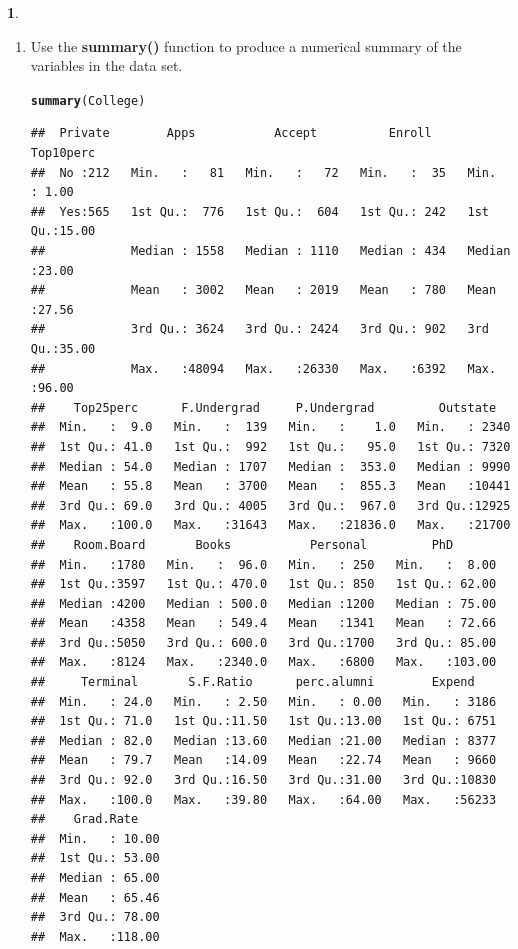 \documentclass[12pt,fleqn]{article}\usepackage[]{graphicx}\usepackage[]{color}
\makeatletter
\newcommand{\hlstd}[1]{\textcolor[rgb]{0.345,0.345,0.345}{#1}}%
\newcommand{\hlkwd}[1]{\textcolor[rgb]{0.737,0.353,0.396}{\textbf{#1}}}%
\newenvironment{kframe}{%
 \def\at@end@of@kframe{}%
 \ifinner\ifhmode%
  \def\at@end@of@kframe{\end{minipage}}%
  \begin{minipage}{\columnwidth}%
 \fi\fi%
 \def\FrameCommand##1{\hskip\@totalleftmargin \hskip-\fboxsep
 \colorbox{shadecolor}{##1}\hskip-\fboxsep
     \hskip-\linewidth \hskip-\@totalleftmargin \hskip\columnwidth}%
 \MakeFramed {\advance\hsize-\width
   \@totalleftmargin\z@ \linewidth\hsize
   \@setminipage}}%
 {\par\unskip\endMakeFramed%
 \at@end@of@kframe}
\newenvironment{knitrout}{}{} %
\theoremstyle{definition}
\newtheorem{problem}{}
\makeatother
\begin{document}
\begin{problem}
\begin{enumerate}
	      \item Use the \textbf{summary()} function to produce a numerical summary of the variables in the data set.
\begin{knitrout}
\color{fgcolor}\begin{kframe}
\begin{alltt}
\hlkwd{summary}\hlstd{(College)}
\end{alltt}
\end{kframe}
\end{knitrout}
\begin{knitrout}
\color{fgcolor}\begin{kframe}
\begin{verbatim}
##  Private        Apps           Accept          Enroll       Top10perc    
##  No :212   Min.   :   81   Min.   :   72   Min.   :  35   Min.   : 1.00  
##  Yes:565   1st Qu.:  776   1st Qu.:  604   1st Qu.: 242   1st Qu.:15.00  
##            Median : 1558   Median : 1110   Median : 434   Median :23.00  
##            Mean   : 3002   Mean   : 2019   Mean   : 780   Mean   :27.56  
##            3rd Qu.: 3624   3rd Qu.: 2424   3rd Qu.: 902   3rd Qu.:35.00  
##            Max.   :48094   Max.   :26330   Max.   :6392   Max.   :96.00  
##    Top25perc      F.Undergrad     P.Undergrad         Outstate    
##  Min.   :  9.0   Min.   :  139   Min.   :    1.0   Min.   : 2340  
##  1st Qu.: 41.0   1st Qu.:  992   1st Qu.:   95.0   1st Qu.: 7320  
##  Median : 54.0   Median : 1707   Median :  353.0   Median : 9990  
##  Mean   : 55.8   Mean   : 3700   Mean   :  855.3   Mean   :10441  
##  3rd Qu.: 69.0   3rd Qu.: 4005   3rd Qu.:  967.0   3rd Qu.:12925  
##  Max.   :100.0   Max.   :31643   Max.   :21836.0   Max.   :21700  
##    Room.Board       Books           Personal         PhD        
##  Min.   :1780   Min.   :  96.0   Min.   : 250   Min.   :  8.00  
##  1st Qu.:3597   1st Qu.: 470.0   1st Qu.: 850   1st Qu.: 62.00  
##  Median :4200   Median : 500.0   Median :1200   Median : 75.00  
##  Mean   :4358   Mean   : 549.4   Mean   :1341   Mean   : 72.66  
##  3rd Qu.:5050   3rd Qu.: 600.0   3rd Qu.:1700   3rd Qu.: 85.00  
##  Max.   :8124   Max.   :2340.0   Max.   :6800   Max.   :103.00  
##     Terminal       S.F.Ratio      perc.alumni        Expend     
##  Min.   : 24.0   Min.   : 2.50   Min.   : 0.00   Min.   : 3186  
##  1st Qu.: 71.0   1st Qu.:11.50   1st Qu.:13.00   1st Qu.: 6751  
##  Median : 82.0   Median :13.60   Median :21.00   Median : 8377  
##  Mean   : 79.7   Mean   :14.09   Mean   :22.74   Mean   : 9660  
##  3rd Qu.: 92.0   3rd Qu.:16.50   3rd Qu.:31.00   3rd Qu.:10830  
##  Max.   :100.0   Max.   :39.80   Max.   :64.00   Max.   :56233  
##    Grad.Rate     
##  Min.   : 10.00  
##  1st Qu.: 53.00  
##  Median : 65.00  
##  Mean   : 65.46  
##  3rd Qu.: 78.00  
##  Max.   :118.00
\end{verbatim}
\end{kframe}
\end{knitrout}


\end{enumerate}
\end{problem}
\end{document}
